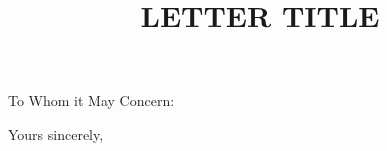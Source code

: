 \documentclass{letter}
\title{LETTER TITLE}
\begin{document}
\begin{letter}{}
\opening{To Whom it May Concern:}

\lipsum[1-3]

\closing{Yours sincerely,}
\end{letter}
\end{document}

